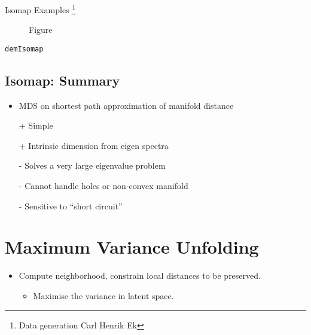 Isomap Examples%
\footnote{Data generation Carl Henrik Ek%
}%
\begin{figure}


\hfill{}


\hfill{}

\hfill{}\caption{Figure}

\end{figure}


\texttt{demIsomap}

\subsection{Isomap: Summary}
\begin{itemize}
\item MDS on shortest path approximation of manifold distance 
\item [+] Simple 
\item [+] Intrinsic dimension from eigen spectra 
\item [-] Solves a very large eigenvalue problem 
\item [-] Cannot handle holes or non-convex manifold 
\item [-] Sensitive to {}``short circuit'' 
\end{itemize}

\section{Maximum Variance Unfolding}
\begin{itemize}
\item Compute neighborhood, constrain local distances to be preserved.

\begin{itemize}
\item Maximise the variance in latent space.
\end{itemize}
\end{itemize}

